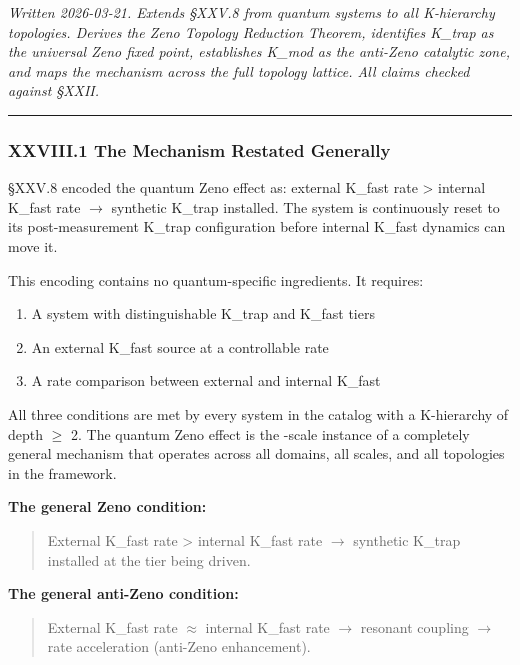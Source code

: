\documentclass[12pt,a4paper]{article}
\begin{document}
\emph{Written 2026-03-21. Extends §XXV.8 from quantum systems to all K-hierarchy topologies. Derives the Zeno Topology Reduction Theorem, identifies K\_trap as the universal Zeno fixed point, establishes K\_mod as the anti-Zeno catalytic zone, and maps the mechanism across the full topology lattice. All claims checked against §XXII.}

\begin{center}
\rule{0.5\textwidth}{0.4pt}
\end{center}

\subsubsection{XXVIII.1 The Mechanism Restated Generally}

§XXV.8 encoded the quantum Zeno effect as: external K\_fast rate \textgreater{} internal K\_fast rate $\rightarrow$ synthetic K\_trap installed. The system is continuously reset to its post-measurement K\_trap configuration before internal K\_fast dynamics can move it.

This encoding contains no quantum-specific ingredients. It requires:

\begin{enumerate}
    \item A system with distinguishable K\_trap and K\_fast tiers
    \item An external K\_fast source at a controllable rate
    \item A rate comparison between external and internal K\_fast
\end{enumerate}

All three conditions are met by every system in the catalog with a K-hierarchy of depth $\geq$ 2. The quantum Zeno effect is the \hbar-scale instance of a completely general mechanism that operates across all domains, all scales, and all topologies in the framework.

\textbf{The general Zeno condition:}

\begin{quote}
External K\_fast rate \textgreater{} internal K\_fast rate $\rightarrow$ synthetic K\_trap installed at the tier being driven.

\end{quote}

\textbf{The general anti-Zeno condition:}

\begin{quote}
External K\_fast rate $\approx$ internal K\_fast rate $\rightarrow$ resonant coupling $\rightarrow$ rate acceleration (anti-Zeno enhancement).

\end{quote}
\end{document}
